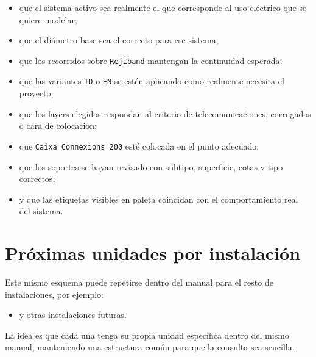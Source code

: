 \documentclass[12pt,a4paper]{article}
\begin{document}
\begin{itemize}
\item que el sistema activo sea realmente el que corresponde al uso eléctrico que se quiere modelar;
\item que el diámetro base sea el correcto para ese sistema;
\item que los recorridos sobre \texttt{Rejiband} mantengan la continuidad esperada;
\item que las variantes \texttt{TD} o \texttt{EN} se estén aplicando como realmente necesita el proyecto;
\item que los layers elegidos respondan al criterio de telecomunicaciones, corrugados o cara de colocación;
\item que \texttt{Caixa Connexions 200} esté colocada en el punto adecuado;
\item que los soportes se hayan revisado con subtipo, superficie, cotas y tipo correctos;
\item y que las etiquetas visibles en paleta coincidan con el comportamiento real del sistema.
\end{itemize}

\section{Próximas unidades por instalación}

Este mismo esquema puede repetirse dentro del manual para el resto de instalaciones, por ejemplo:

\begin{itemize}
\item y otras instalaciones futuras.
\end{itemize}

La idea es que cada una tenga su propia unidad específica dentro del mismo manual, manteniendo una estructura común para que la consulta sea sencilla.
\end{document}

